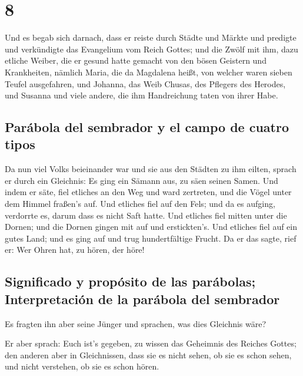 \hypertarget{section-7}{%
\section{8}\label{section-7}}

 Und es begab sich darnach, dass er reiste durch Städte
und Märkte und predigte und verkündigte das Evangelium vom Reich Gottes;
und die Zwölf mit ihm,  dazu etliche Weiber, die er gesund
hatte gemacht von den bösen Geistern und Krankheiten, nämlich Maria, die
da Magdalena heißt, von welcher waren sieben Teufel ausgefahren,
 und Johanna, das Weib Chusas, des Pflegers des Herodes,
und Susanna und viele andere, die ihm Handreichung taten von ihrer Habe.

\hypertarget{paruxe1bola-del-sembrador-y-el-campo-de-cuatro-tipos}{%
\subsection{Parábola del sembrador y el campo de cuatro
tipos}\label{paruxe1bola-del-sembrador-y-el-campo-de-cuatro-tipos}}

 Da nun viel Volks beieinander war und sie aus den Städten
zu ihm eilten, sprach er durch ein Gleichnis:  Es ging ein
Sämann aus, zu säen seinen Samen. Und indem er säte, fiel etliches an
den Weg und ward zertreten, und die Vögel unter dem Himmel fraßen's auf.
 Und etliches fiel auf den Fels; und da es aufging,
verdorrte es, darum dass es nicht Saft hatte.  Und
etliches fiel mitten unter die Dornen; und die Dornen gingen mit auf und
erstickten's.  Und etliches fiel auf ein gutes Land; und
es ging auf und trug hundertfältige Frucht. Da er das sagte, rief er:
Wer Ohren hat, zu hören, der höre!

\hypertarget{significado-y-propuxf3sito-de-las-paruxe1bolas-interpretaciuxf3n-de-la-paruxe1bola-del-sembrador}{%
\subsection{Significado y propósito de las parábolas; Interpretación de
la parábola del
sembrador}\label{significado-y-propuxf3sito-de-las-paruxe1bolas-interpretaciuxf3n-de-la-paruxe1bola-del-sembrador}}

 Es fragten ihn aber seine Jünger und sprachen, was dies
Gleichnis wäre?

 Er aber sprach: Euch ist's gegeben, zu wissen das
Geheimnis des Reiches Gottes; den anderen aber in Gleichnissen, dass sie
es nicht sehen, ob sie es schon sehen, und nicht verstehen, ob sie es
schon hören.

